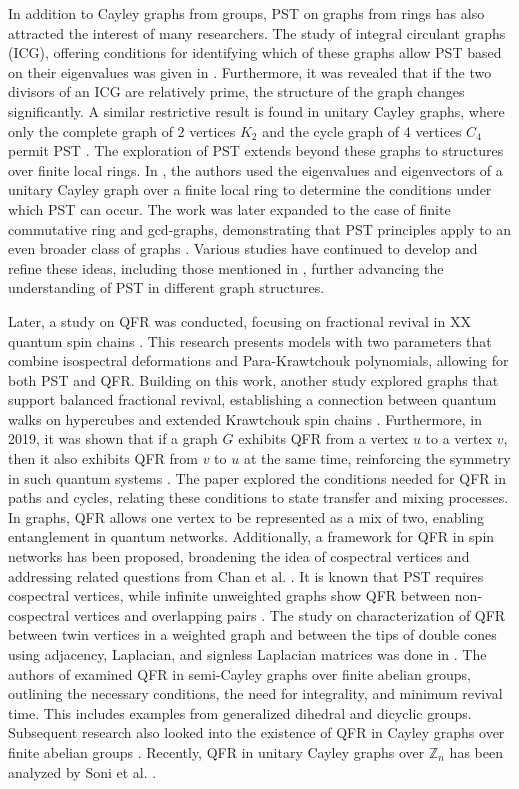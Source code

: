\documentclass[12pt]{amsart}
\numberwithin{equation}{section}
\theoremstyle{definition}
\theoremstyle{definition} \numberwithin{equation}{section}
\begin{document}
In addition to Cayley graphs from groups, PST on graphs from rings has also attracted the interest of many researchers. The study of integral circulant graphs (ICG), offering conditions for identifying which of these graphs allow PST based on their eigenvalues was given in \cite{BM2}. Furthermore, it was revealed that if the two divisors of an ICG are relatively prime, the structure of the graph changes significantly. A similar restrictive result is found in unitary Cayley graphs, where only the complete graph of $2$ vertices $K_2$ and the cycle graph of $4$ vertices $C_4$ permit PST \cite{BM}. The exploration of PST extends beyond these graphs to structures over finite local rings. In \cite{MY}, the authors used the eigenvalues and eigenvectors of a unitary Cayley graph over a finite local ring to determine the conditions under which PST can occur. The work was later expanded to the case of finite commutative ring and gcd-graphs, demonstrating that PST principles apply to an even broader class of graphs \cite{TI}. Various studies have continued to develop and refine these ideas, including those mentioned in \cite{CWC, KVM}, further advancing the understanding of PST in different graph structures. 


Later, a study on QFR was conducted, focusing on fractional revival in XX quantum spin chains \cite{GVX}. This research presents models with two parameters that combine isospectral deformations and Para-Krawtchouk polynomials, allowing for both PST and QFR. Building on this work, another study explored graphs that support balanced fractional revival, establishing a connection between quantum walks on hypercubes and extended Krawtchouk spin chains \cite{BPA}. Furthermore, in 2019, it was shown that if a graph $G$ exhibits QFR from a vertex $u$ to a vertex $v$, then it also exhibits QFR from $v$ to $u$ at the same time, reinforcing the symmetry in such quantum systems \cite{CA}. The paper \cite{CA2} explored the conditions needed for QFR in paths and cycles, relating these conditions to state transfer and mixing processes. In graphs, QFR allows one vertex to be represented as a mix of two, enabling entanglement in quantum networks. Additionally, a framework for QFR in spin networks has been proposed, broadening the idea of cospectral vertices and addressing related questions from Chan et al. \cite{CA3}. It is known that PST requires cospectral vertices, while infinite unweighted graphs show QFR between non-cospectral vertices and overlapping pairs \cite{GC3}. 
The study on characterization of QFR between twin vertices in a weighted graph and between the tips of double cones using adjacency, Laplacian, and signless Laplacian matrices was done in \cite{MH}. The authors of \cite{WJ} examined QFR in semi-Cayley graphs over finite abelian groups, outlining the necessary conditions, the need for integrality, and minimum revival time. This includes examples from generalized dihedral and dicyclic groups. Subsequent research also looked into the existence of QFR in Cayley graphs over finite abelian groups \cite{WJ2}. Recently, QFR in unitary Cayley graphs over $\mathbb{Z}_n$ has been analyzed by Soni et al. \cite{SR}.
\end{document}
